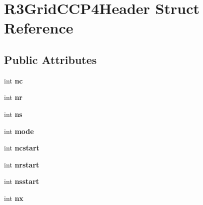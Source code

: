 \hypertarget{struct_r3_grid_c_c_p4_header}{}\section{R3\+Grid\+C\+C\+P4\+Header Struct Reference}
\label{struct_r3_grid_c_c_p4_header}
\subsection*{Public Attributes}
\begin{DoxyCompactItemize}
\item 
int {\bfseries nc}\hypertarget{struct_r3_grid_c_c_p4_header_af3da6fd55a072e1f0f2cfa56ae06d47e}{}\label{struct_r3_grid_c_c_p4_header_af3da6fd55a072e1f0f2cfa56ae06d47e}

\item 
int {\bfseries nr}\hypertarget{struct_r3_grid_c_c_p4_header_aae0b78a938ec378d7037008165bd0abc}{}\label{struct_r3_grid_c_c_p4_header_aae0b78a938ec378d7037008165bd0abc}

\item 
int {\bfseries ns}\hypertarget{struct_r3_grid_c_c_p4_header_adc419f0673211713afc7816e2c2339de}{}\label{struct_r3_grid_c_c_p4_header_adc419f0673211713afc7816e2c2339de}

\item 
int {\bfseries mode}\hypertarget{struct_r3_grid_c_c_p4_header_a4551cc5ea96c7c2610381fb5b092d99a}{}\label{struct_r3_grid_c_c_p4_header_a4551cc5ea96c7c2610381fb5b092d99a}

\item 
int {\bfseries ncstart}\hypertarget{struct_r3_grid_c_c_p4_header_a9b81a6375f239165efdeef5d44015d6b}{}\label{struct_r3_grid_c_c_p4_header_a9b81a6375f239165efdeef5d44015d6b}

\item 
int {\bfseries nrstart}\hypertarget{struct_r3_grid_c_c_p4_header_a5a90ccadce657c4cca5ef381f45109e5}{}\label{struct_r3_grid_c_c_p4_header_a5a90ccadce657c4cca5ef381f45109e5}

\item 
int {\bfseries nsstart}\hypertarget{struct_r3_grid_c_c_p4_header_ad5f16d08d27ba9b81927f83e4fe40348}{}\label{struct_r3_grid_c_c_p4_header_ad5f16d08d27ba9b81927f83e4fe40348}

\item 
int {\bfseries nx}\hypertarget{struct_r3_grid_c_c_p4_header_a818b6561622484d667d4385f8a9062ba}{}\label{struct_r3_grid_c_c_p4_header_a818b6561622484d667d4385f8a9062ba}


\end{DoxyCompactItemize}
